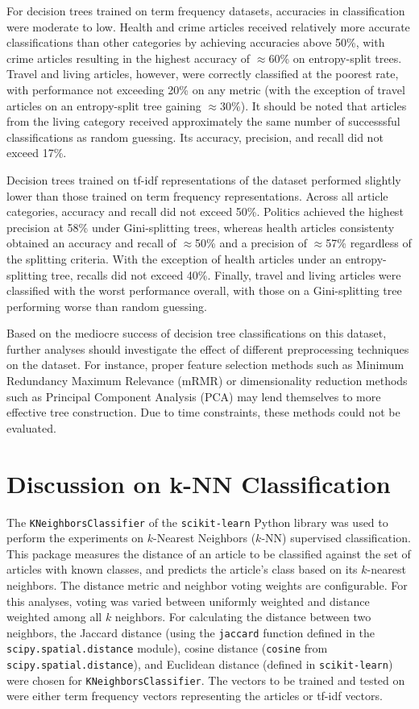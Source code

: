 \documentclass[11pt]{article}
\begin{document}
For decision trees trained on term frequency datasets, accuracies in classification were moderate to low.
Health and crime articles received relatively more accurate classifications than other categories by achieving accuracies above 50\%, with crime articles resulting in the highest accuracy of $\approx$60\% on entropy-split trees.
Travel and living articles, however, were correctly classified at the poorest rate, with performance not exceeding 20\% on any metric (with the exception of travel articles on an entropy-split tree gaining $\approx$30\%).
It should be noted that articles from the living category received approximately the same number of successsful classifications as random guessing.
Its accuracy, precision, and recall did not exceed 17\%.

Decision trees trained on tf-idf representations of the dataset performed slightly lower than those trained on term frequency representations.
Across all article categories, accuracy and recall did not exceed 50\%.
Politics achieved the highest precision at 58\% under Gini-splitting trees, whereas health articles consistenty obtained an accuracy and recall of $\approx$50\% and a precision of $\approx$57\% regardless of the splitting criteria.
With the exception of health articles under an entropy-splitting tree, recalls did not exceed 40\%.
Finally, travel and living articles were classified with the worst performance overall, with those on a Gini-splitting tree performing worse than random guessing.

Based on the mediocre success of decision tree classifications on this dataset, further analyses should investigate the effect of different preprocessing techniques on the dataset.
For instance, proper feature selection methods such as Minimum Redundancy Maximum Relevance (mRMR) or dimensionality reduction methods such as Principal Component Analysis (PCA) may lend themselves to more effective tree construction.
Due to time constraints, these methods could not be evaluated.


\section{Discussion on k-NN Classification} \label{sec:knn}

The \texttt{KNeighborsClassifier} of the \texttt{scikit-learn} Python library was used to perform the experiments on $k$-Nearest Neighbors ($k$-NN) supervised classification.
This package measures the distance of an article to be classified against the set of articles with known classes, and predicts the article's class based on its $k$-nearest neighbors.
The distance metric and neighbor voting weights are configurable.
For this analyses, voting was varied between uniformly weighted and distance weighted among all $k$ neighbors.
For calculating the distance between two neighbors, the Jaccard distance (using the \texttt{jaccard} function defined in the \texttt{scipy.spatial.distance} module), cosine distance (\texttt{cosine} from \texttt{scipy.spatial.distance}), and Euclidean distance (defined in \texttt{scikit-learn}) were chosen for \texttt{KNeighborsClassifier}.
The vectors to be trained and tested on were either term frequency vectors representing the articles or tf-idf vectors.
\end{document}
